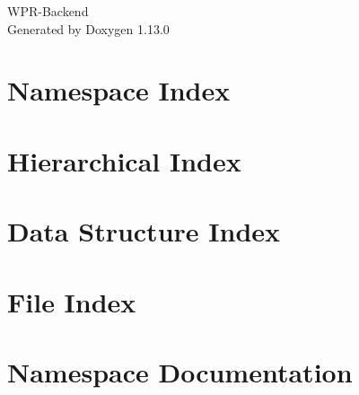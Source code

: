 \documentclass[twoside]{book}
\newcommand{\+}{\discretionary{\mbox{\scriptsize$\hookleftarrow$}}{}{}}
\newcommand{\clearemptydoublepage}{%
    \newpage{\pagestyle{empty}\cleardoublepage}%
  }
\begin{document}
  \raggedbottom
    \hypersetup{pageanchor=false,
                bookmarksnumbered=true,
                pdfencoding=unicode
               }
  \begin{titlepage}
  \vspace*{7cm}
  \begin{center}%
  {\Large WPR-\/\+Backend}\\
  \vspace*{1cm}
  {\large Generated by Doxygen 1.13.0}\\
  \end{center}
  \end{titlepage}
  \clearemptydoublepage
  \tableofcontents
  \clearemptydoublepage
  \hypersetup{pageanchor=true}
\chapter{Namespace Index}

\chapter{Hierarchical Index}

\chapter{Data Structure Index}

\chapter{File Index}

\chapter{Namespace Documentation}

















\end{document}
